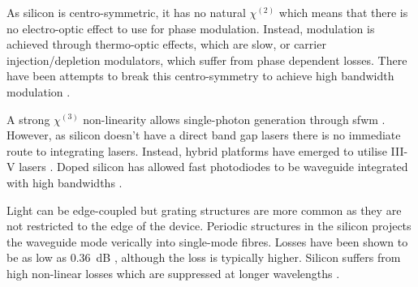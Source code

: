 As silicon is centro-symmetric, it has no natural $\chi^{(2)}$ which means that there is no electro-optic effect to use for phase modulation. Instead, modulation is achieved through thermo-optic effects, which are slow, or carrier injection/depletion modulators, which suffer from phase dependent losses. There have been attempts to break this centro-symmetry to achieve high bandwidth modulation \cite{cazzanelli2016second, castellan2019origin}.

A strong $\chi^{(3)}$ non-linearity allows single-photon generation through \ac{sfwm} \cite{SilverstoneThesis}. However, as silicon doesn't have a direct band gap lasers there is no immediate route to integrating lasers. Instead, hybrid platforms have emerged to utilise III-V lasers \cite{Fan2017, Agnesi2019}. Doped silicon has allowed fast photodiodes to be waveguide integrated with high bandwidths \cite{raffaelli2018generation}.

Light can be edge-coupled but grating structures are more common as they are not restricted to the edge of the device. Periodic structures in the silicon projects the waveguide mode verically into single-mode fibres. Losses have been shown to be as low as \SI{0.36}{dB} \cite{Notaros2016}, although the loss is typically higher. Silicon suffers from high non-linear losses which are suppressed at longer wavelengths \cite{rosenfeld2019mid}.






